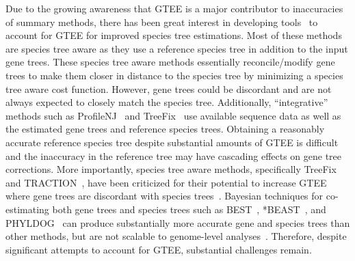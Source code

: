 \documentclass[runningheads]{llncs}
\newcommand{\add}[1]{{\color{blue} #1}}
\begin{document}
Due to the growing awareness that GTEE is a major contributor to inaccuracies of summary methods, there has been great interest in developing tools~\cite{notung,treefix,rasmussen2011bayesian,traction,profilenj,tt,treefix-dtl-bansal2015improved,nguyen2012accounting,jacox2017resolution,lafond2017gene} to account for GTEE for improved species tree estimations. Most of these methods are species tree aware as they use a reference species tree in addition to the input gene trees. These species tree aware methods essentially reconcile/modify gene trees to make them closer in distance to the species tree by minimizing a species tree aware cost function. However, gene trees could be discordant and are not always expected to closely match the species tree. %
Additionally, ``integrative'' methods such as ProfileNJ~\cite{profilenj} and TreeFix~\cite{treefix} use available sequence data as well as the estimated gene trees and reference species trees. Obtaining a reasonably accurate reference species tree despite substantial amounts of GTEE is difficult and the inaccuracy in the reference tree may have cascading effects on gene tree corrections. More importantly, species tree aware methods, specifically TreeFix and TRACTION~\cite{traction}, have been criticized for their potential to increase GTEE where gene trees are discordant with species trees~\cite{zhiyan}. Bayesian techniques for co-estimating both gene trees and species trees such as BEST~\cite{best}, *BEAST~\cite{heled-drummond}, and PHYLDOG~\cite{boussau2013genome} 
can produce substantially more accurate gene and species trees than other methods, but are not scalable to genome-level analyses~\cite{bayzid2013naive,smith2013target,bayzid-incomplete,leache-rannala,szollHosi2015inference}.
Therefore, despite significant attempts to account for GTEE, substantial challenges remain.



\end{document}
